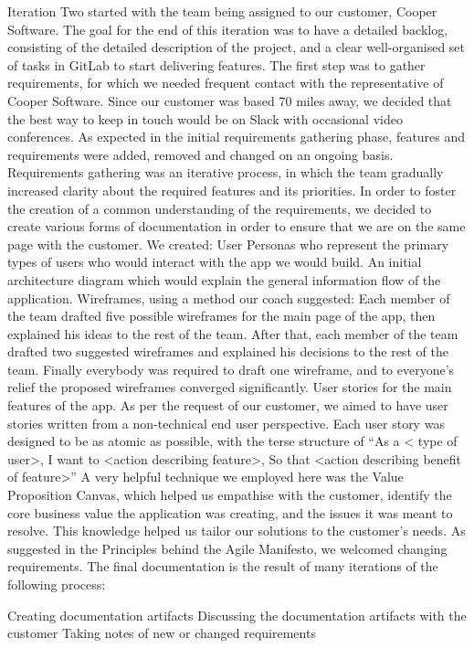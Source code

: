 \documentclass{l3proj}
\begin{document}
Iteration Two started with the team being assigned to our customer, Cooper Software. The goal for the end of this iteration was to have a detailed backlog, consisting of the detailed description of the project, and a clear well-organised set of tasks in GitLab to start delivering features.
The first step was to gather requirements, for which we needed frequent contact with the representative of Cooper Software. Since our customer was based 70 miles away, we decided that the best way to keep in touch would be on Slack with occasional video conferences.
As expected in the initial requirements gathering phase, features and requirements were added, removed and changed on an ongoing basis. Requirements gathering was an iterative process, in which the team gradually increased clarity about the required features and its priorities.
In order to foster the creation of a common understanding of the requirements, we decided to create various forms of documentation in order to ensure that we are on the same page with the customer. We created:
User Personas who represent the primary types of users who would interact with the app we would build.
An initial architecture diagram which would explain the general information flow of the application.
Wireframes, using a method our coach suggested: 
Each member of the team drafted five possible wireframes for the main page of the app, then explained his ideas to the rest of the team. After that, each member of the team drafted two suggested wireframes and explained his decisions to the rest of the team.
Finally everybody was required to draft one wireframe, and to everyone’s relief the proposed wireframes converged significantly.
User stories for the main features of the app. As per the request of our customer, we aimed to have user stories written from a non-technical end user perspective. Each user story was designed to be as atomic as possible, with the terse structure of “As a < type of user>, I want to <action describing feature>, So that <action describing benefit of feature>”
A very helpful technique we employed here was the Value Proposition Canvas, which helped us empathise with the customer, identify the core business value the application was creating, and the issues it was meant to resolve. This knowledge helped us tailor our solutions to the customer’s needs.
As suggested in the Principles behind the Agile Manifesto, we welcomed changing requirements.
The final documentation is the result of many iterations of the following process:

Creating documentation artifacts
Discussing the documentation artifacts with the customer
Taking notes of new or changed requirements
\end{document}
